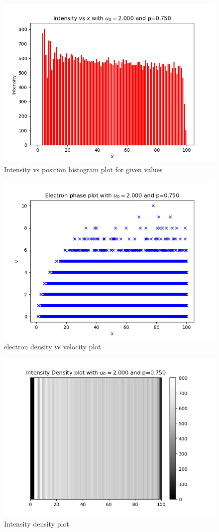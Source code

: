 \documentclass[11pt]{article}
\begin{document}
\begin{figure}[H]
    \centering
    \includegraphics[scale = 1]{4_b.png}
    \caption{Intensity vs position histogram plot for given values}
\end{figure}

\begin{figure}[H]
    \centering
    \includegraphics[scale = 1]{4_c.png}
    \caption{electron density vs velocity plot}
\end{figure}

\begin{figure}[H]
    \centering
    \includegraphics[scale = 1]{4_d.png}
    \caption{Intensity density plot}
\end{figure}
\end{document}
